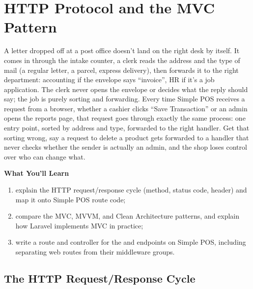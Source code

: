 
\chapter{HTTP Protocol and the MVC Pattern}
\label{ch:http-dan-mvc}


A letter dropped off at a post office doesn't land on the right desk by
itself. It comes in through the intake counter, a clerk reads the address
and the type of mail (a regular letter, a parcel, express delivery), then
forwards it to the right department: accounting if the envelope says
``invoice'', HR if it's a job application. The clerk never opens the
envelope or decides what the reply should say; the job is purely sorting
and forwarding. Every time Simple POS receives a request from a browser,
whether a cashier clicks ``Save Transaction'' or an admin opens the reports
page, that request goes through exactly the same process: one entry point,
sorted by address and type, forwarded to the right handler. Get that
sorting wrong, say a request to delete a product gets forwarded to a
handler that never checks whether the sender is actually an admin, and the
shop loses control over who can change what.

\textbf{What You'll Learn}

\begin{enumerate}
  \item explain the HTTP request/response cycle (method, status code, header) and map it onto Simple POS route code;
  \item compare the MVC, MVVM, and Clean Architecture patterns, and explain how Laravel implements MVC in practice;
  \item write a route and controller for the  and  endpoints on Simple POS, including separating web routes from their middleware groups.
\end{enumerate}

\section{The HTTP Request/Response Cycle}
\label{sec:http-dan-mvc-1}

